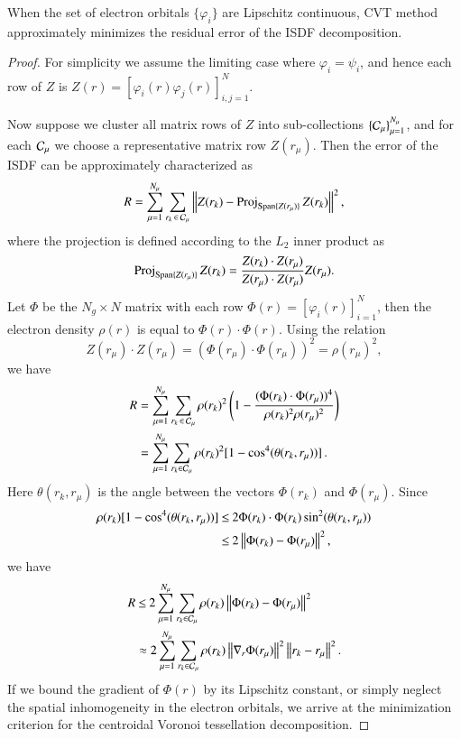 \begin{theorem}
  When the set of electron orbitals $\{\varphi_i\}$ are Lipschitz continuous,
  CVT method approximately minimizes the residual error of the ISDF
  decomposition.
\end{theorem}
\begin{proof}
  For simplicity we assume the limiting case where $\varphi_{i}=\psi_{i}$, and
  hence each row of $Z$ is $Z(r)=[\varphi_{i}(r)\varphi_{j}(r)]_{i,j=1}^N$.

  Now suppose we cluster all matrix rows of $Z$ into sub\hyp{}collections $
  \{\mathcal{C}_\mu\}_{\mu=1}^{N_\mu}$, and for each $\mathcal{C}_\mu$ we choose a
  representative matrix row $Z(r_\mu)$. Then the error of the ISDF can be
  approximately characterized as
  \begin{equation}\label{eqn:ISDFerror}
    R = \sum_{\mu = 1}^{N_\mu}\sum_{r_k\operatorname{\in} \mathcal{C}_\mu}\left\lVert Z(r_k)- \operatorname{Proj}_{\operatorname{Span}
    \{Z(r_{\mu})\}}Z(r_k)\right\rVert^2,
  \end{equation}
  where the projection is defined according to the $L_2$ inner product as
  \begin{equation}\label{eqn:Zprojection}
    \operatorname{Proj}_{\operatorname{Span}\{Z(r_{\mu})\}}Z(r_k) = \frac{Z(r_{k})\cdot Z(r_\mu)}{Z
    (r_\mu)\cdot Z(r_\mu)}Z(r_{\mu}).
  \end{equation}
  Let $\Phi$ be the $N_{g} \times N$ matrix with each row $\Phi(r) = 
  [\varphi_i(r)]_{i=1}^N$, then the electron density $\rho(r)$ is equal to
  $\Phi(r)\cdot \Phi(r)$. Using the relation
  \begin{equation}\label{eqn:ZtoPhi}
    Z(r_\mu)\cdot Z(r_\mu) = (\Phi(r_{\mu})\cdot \Phi(r_{\mu}))^2 = \rho(r_
    {\mu})^2,
  \end{equation}
  we have
  \begin{align}
    R &= \sum_{\mu=1}^{N_\mu}\sum_{r_k\operatorname{\in} \mathcal{C}_\mu}\rho(r_k)^2 \left(1-
    \frac{(\Phi(r_{k})\cdot\Phi(r_{\mu}))^4}{\rho(r_k)^2\rho(r_\mu)^2}\right)\\
    &= \sum_{\mu=1}^{N_\mu}\sum_{r_k\in \mathcal{C}_\mu}\rho(r_k)^2 [1-\cos^4(\theta
    (r_k,r_\mu))]\,.
  \end{align}
  Here $\theta(r_{k},r_{\mu})$ is the angle between the vectors $\Phi(r_{k})$
  and $\Phi(r_{\mu})$. Since
  \begin{align}
    \rho(r_k) [1-\cos^4(\theta(r_k,r_\mu))] &\mathbin{\leq} 2 \Phi(r_{k})\cdot \Phi(r_
    {k})\sin^{2}(\theta(r_k,r_\mu)) \\
    &\mathbin{\leq} 2 \left\lVert\Phi(r_{k})-\Phi(r_{\mu})\right\rVert^2,
  \end{align}
  we have
  \begin{align}
    R &\mathbin{\leq} 2 \sum_{\mu=1}^{N_\mu}\sum_{r_k\in \mathcal{C}_\mu}\rho(r_k) 
    \left\lVert\Phi(r_{k})-\Phi(r_{\mu})\right\rVert^2 \\
    &\approx 2 \sum_{\mu=1}^{N_\mu}\sum_{r_k\in \mathcal{C}_\mu}\rho(r_k)
    \left\lVert\nabla_{r}\Phi(r_{\mu})\right\rVert^2 \left\lVert r_{k}-r_{\mu}\right\rVert^2.
  \end{align}
  If we bound the gradient of $\Phi(r)$ by its Lipschitz constant, or simply
  neglect the spatial inhomogeneity in the electron orbitals, we arrive at the
  minimization criterion for the centroidal Voronoi tessellation decomposition.
\end{proof}

